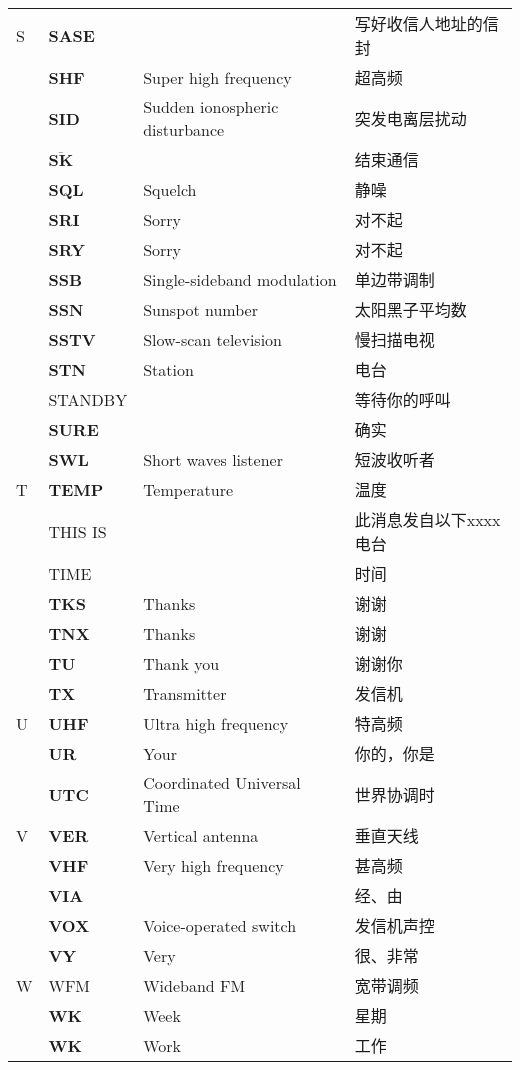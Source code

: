 \begin{longtable}[l]{llll}
S & \textbf{SASE} & & 写好收信人地址的信封 \\
& \textbf{SHF} & Super high frequency & 超高频 \\
& \textbf{SID} & Sudden ionospheric disturbance & 突发电离层扰动 \\
& $\overline{\mathbf{S}\mathbf{K}}$ & & 结束通信 \\
& \textbf{SQL} & Squelch & 静噪 \\
& \textbf{SRI} & Sorry & 对不起 \\
& \textbf{SRY} & Sorry & 对不起 \\
& \textbf{SSB} & Single-sideband modulation & 单边带调制 \\
& \textbf{SSN} & Sunspot number & 太阳黑子平均数 \\
& \textbf{SSTV} & Slow-scan television & 慢扫描电视 \\
& \textbf{STN} & Station & 电台 \\
& STANDBY & & 等待你的呼叫 \\
& \textbf{SURE} & & 确实 \\
& \textbf{SWL} & Short waves listener & 短波收听者 \\
T & \textbf{TEMP} & Temperature & 温度 \\
& THIS IS & & 此消息发自以下xxxx电台 \\
& TIME & & 时间 \\
& \textbf{TKS} & Thanks & 谢谢 \\
& \textbf{TNX} & Thanks & 谢谢 \\
& \textbf{TU} & Thank you & 谢谢你 \\
& \textbf{TX} & Transmitter & 发信机 \\
U & \textbf{UHF} & Ultra high frequency & 特高频 \\
& \textbf{UR} & Your & 你的，你是 \\
& \textbf{UTC} & Coordinated Universal Time & 世界协调时 \\%
V & \textbf{VER} & Vertical antenna & 垂直天线 \\
& \textbf{VHF} & Very high frequency & 甚高频 \\
& \textbf{VIA} & & 经、由 \\
& \textbf{VOX} & Voice-operated switch & 发信机声控 \\
& \textbf{VY} & Very & 很、非常 \\
W & WFM & Wideband FM & 宽带调频 \\
& \textbf{WK} & Week & 星期 \\
& \textbf{WK} & Work & 工作 \\

\end{longtable}
